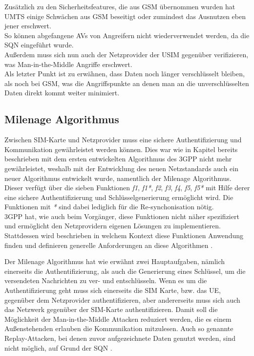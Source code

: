  Zusätzlich zu den Sicherheitsfeatures, die aus GSM übernommen wurden hat UMTS einige
 Schwächen aus GSM beseitigt oder zumindest das Ausnutzen eben jener erschwert. \\
 So können abgefangene \acp{AV} von Angreifern nicht wiederverwendet werden, da
 die SQN eingeführt wurde. \cite{putz01}\\
 Außerdem muss sich nun auch der Netzprovider der USIM gegenüber verifizieren, was
 Man-in-the-Middle Angriffe erschwert. \cite{putz01} \\
 Als letzter Punkt ist zu erwähnen, dass Daten noch länger verschlüsselt bleiben, als noch
 bei GSM, was die Angriffspunkte an denen man an die unverschlüsselten Daten direkt
 kommt weiter minimiert. \cite{spitz11}

\subsection{Milenage Algorithmus}
\label{milenage}
Zwischen \ac{SIM}-Karte und Netzprovider muss eine sichere Authentifizierung und
Kommunikation gewährleistet werden können. Dies war wie in Kapitel 
bereits beschrieben mit dem ersten entwickelten Algorithmus des \ac{3GPP} nicht mehr
gewährleistet, weshalb mit der Entwicklung des neuen Netzstandards auch ein neuer
Algorithmus entwickelt wurde, namentlich der Milenage Algorithmus. \\
Dieser verfügt über die sieben Funktionen \emph{f1}, \emph{f1*}, \emph{f2}, \emph{f3},
\emph{f4}, \emph{f5}, \emph{f5*} mit Hilfe derer eine sichere Authentifizierung und
Schlüsselgenerierung ermöglicht wird. Die Funktionen mit \emph{*} sind dabei lediglich für die
Re-synchonisation nötig. \\
3GPP hat, wie auch beim Vorgänger, diese Funktionen nicht näher spezifiziert und ermöglicht
den Netzprovidern eigenen Lösungen zu implementieren. Stattdessen wird beschrieben in
welchem Kontext diese Funktionen Anwendung finden und definieren generelle Anforderungen
an diese Algorithmen \cite{3gpp.35.205}.

Der Milenage Algorithmus hat wie erwähnt zwei Hauptaufgaben, nämlich einerseits die
Authentifizierung, als auch die Generierung eines Schlüssel, um die versendeten Nachrichten zu
ver- und entschlüsseln. Wenn es um die Authentifizierung geht muss sich einerseits die SIM
Karte, bzw. das \ac{UE}, gegenüber dem Netzprovider authentifizieren, aber andererseits
muss sich auch das Netzwerk gegenüber der SIM-Karte authentifizieren. Damit soll die
Möglichkeit der Man-in-the-Middle Attacken reduziert werden, die es einem Außenstehenden
erlauben die Kommunikation mitzulesen. Auch so genannte Replay-Attacken, bei denen zuvor
aufgezeichnete Daten genutzt werden, sind nicht möglich, auf Grund der \acl{SQN} \cite{spitz11}.

